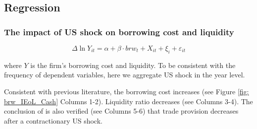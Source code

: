 \documentclass[12pt]{article}
\begin{document}
\subsection{Regression}

\subsubsection{The impact of US shock on borrowing cost and liquidity}

$$
\Delta \ln Y_{it} = \alpha +\beta \cdot brw_{t}+X_{it}+\xi_{i}+\varepsilon_{i t}
$$

where $Y$ is the firm's borrowing cost and liquidity. To be consistent with the frequency of dependent variables, here we aggregate US shock in the year level.

Consistent with previous literature, the borrowing cost increases (see Figure \ref{fig: brw_IEoL_Cash} Columns 1-2). Liquidity ratio decreases (see Columns 3-4). The conclusion of \cite{lin2018foreign} is also verified (see Columns 5-6) that trade provision decreases after a contractionary US shock.
\end{document}
